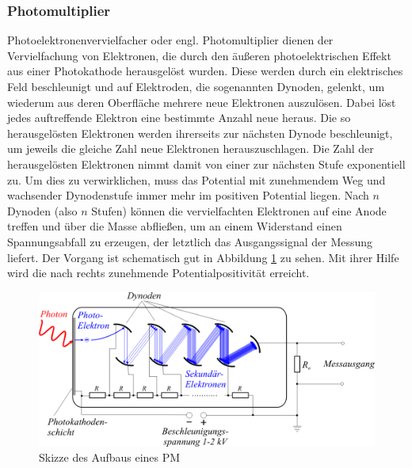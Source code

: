         \subsubsection{Photomultiplier}
            Photoelektronenvervielfacher oder engl. Photomultiplier dienen der Vervielfachung von Elektronen, die durch den äußeren photoelektrischen Effekt aus einer Photokathode herausgelöst wurden. Diese werden durch ein elektrisches Feld beschleunigt und auf Elektroden, die sogenannten Dynoden, gelenkt, um wiederum aus deren Oberfläche mehrere neue Elektronen auszulösen. Dabei löst jedes auftreffende Elektron eine bestimmte Anzahl neue heraus. Die so herausgelösten Elektronen werden ihrerseits zur nächsten Dynode beschleunigt, um jeweils die gleiche Zahl neue Elektronen herauszuschlagen. Die Zahl der herausgelösten Elektronen nimmt damit von einer zur nächsten Stufe exponentiell zu. Um dies zu verwirklichen, muss das Potential mit zunehmendem Weg und wachsender Dynodenstufe immer mehr im positiven Potential liegen. Nach $n$ Dynoden (also $n$ Stufen) können die vervielfachten Elektronen auf eine Anode treffen und über die Masse abfließen, um an einem Widerstand einen Spannungsabfall zu erzeugen, der letztlich das Ausgangssignal der Messung liefert.
            Der Vorgang ist schematisch gut in Abbildung \ref{pm} zu sehen. Mit ihrer Hilfe wird die nach rechts zunehmende Potentialpositivität erreicht. 
            \begin{figure}[htbp]
                \centering \includegraphics[scale=1]{pic/pm.png}
                \caption{Skizze des Aufbaus eines PM \cite{pm}}
                \label{pm}
            \end{figure}
